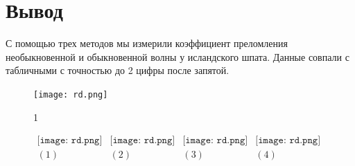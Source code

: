 \section{Вывод}
С помощью трех методов мы измерили коэффициент преломления необыкновенной и обыкновенной волны у исландского шпата. Данные совпали с табличными с точностью до 2 цифры после запятой.









\lipsum[1-4]
\begin{figure}
\centering
\texttt{[image: rd.png]}
\caption{1}
\end{figure}
\lipsum[1-6]


\begin{figure}[h]
\begin{center}$
\begin{array}{cccc}
\texttt{[image: rd.png]}&
\texttt{[image: rd.png]}&
\texttt{[image: rd.png]}&
\texttt{[image: rd.png]}\\
(1) & (2) & (3) & (4)
\end{array}$
\end{center}
\end{figure}
